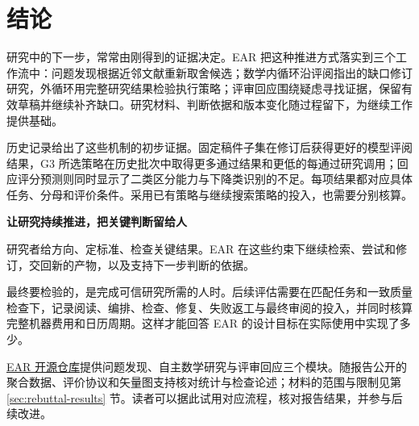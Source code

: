 \FloatBarrier
\clearpage
\section{结论}
\label{sec:conclusion}
研究中的下一步，常常由刚得到的证据决定。EAR 把这种推进方式落实到三个工作流中：问题发现根据近邻文献重新取舍候选；数学内循环沿评阅指出的缺口修订研究，外循环用完整研究结果检验执行策略；评审回应围绕疑虑寻找证据，保留有效草稿并继续补齐缺口。研究材料、判断依据和版本变化随过程留下，为继续工作提供基础。

历史记录给出了这些机制的初步证据。固定稿件子集在修订后获得更好的模型评阅结果，G3 所选策略在历史批次中取得更多通过结果和更低的每通过研究调用；回应评分预测则同时显示了二类区分能力与下降类识别的不足。每项结果都对应具体任务、分母和评价条件。采用已有策略与继续搜索策略的投入，也需要分别核算。

\begin{insight}
\textbf{让研究持续推进，把关键判断留给人}\par
研究者给方向、定标准、检查关键结果。EAR 在这些约束下继续检索、尝试和修订，交回新的产物，以及支持下一步判断的依据。
\end{insight}

最终要检验的，是完成可信研究所需的人时。后续评估需要在匹配任务和一致质量检查下，记录阅读、编排、检查、修复、失败返工与最终审阅的投入，并同时核算完整机器费用和日历周期。这样才能回答 EAR 的设计目标在实际使用中实现了多少。

\href{https://github.com/liyingze07-svg/EffectiveAutoResearch-EAR-}{EAR 开源仓库}提供问题发现、自主数学研究与评审回应三个模块。随报告公开的聚合数据、评价协议和矢量图支持核对统计与检查论述；材料的范围与限制见第\ref{sec:rebuttal-results} 节。读者可以据此试用对应流程，核对报告结果，并参与后续改进。

